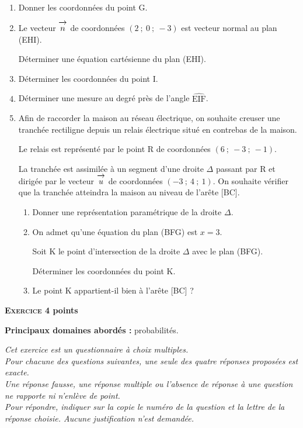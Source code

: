 \documentclass[10pt,a4paper]{article}
\newcommand{\vect}[1]{\overrightarrow{\,\mathstrut#1\,}}
\begin{document}
\begin{enumerate}
\item Donner les coordonnées du point G.
\item Le vecteur $\vect{n}$ de coordonnées $(2~;~0~;~-3)$ est vecteur normal au plan (EHI).

Déterminer une équation cartésienne du plan (EHI).
\item Déterminer les coordonnées du point I.
\item Déterminer une mesure au degré près de l'angle $\widehat{\text{EIF}}$.
\item Afin de raccorder la maison au réseau électrique, on souhaite creuser une tranchée rectiligne depuis un relais électrique situé en contrebas de la maison.

Le relais est représenté par le point R de coordonnées $(6~;~- 3~;~- 1)$.

La tranchée est assimilée à un segment d'une droite $\Delta$ passant par R et dirigée par le vecteur $\vect{u}$ de coordonnées $(-3~;~4~;~1)$. On souhaite vérifier que la tranchée atteindra la maison au niveau de l'arête [BC].
	\begin{enumerate}
		\item Donner une représentation paramétrique de la droite $\Delta$.
		\item On admet qu'une équation du plan (BFG) est $x = 3$.
		
Soit K le point d'intersection de la droite $\Delta$ avec le plan (BFG).

Déterminer les coordonnées du point K.
		\item Le point K appartient-il bien à l'arête [BC] ?
	\end{enumerate}
\end{enumerate}

\bigskip

\textbf{\textsc{Exercice 4}  points\hfill}

\medskip

\textbf{Principaux domaines abordés :} 
probabilités.

\medskip

\emph{Cet exercice est un questionnaire à choix multiples.\\
Pour chacune des questions suivantes, une seule des quatre réponses proposées est exacte.\\
Une réponse fausse, une réponse multiple ou l'absence de réponse à une question ne rapporte ni n'enlève de point.\\
Pour répondre, indiquer sur la copie le numéro de la question et la lettre de la réponse choisie. Aucune justification n'est demandée.}
\end{document}
